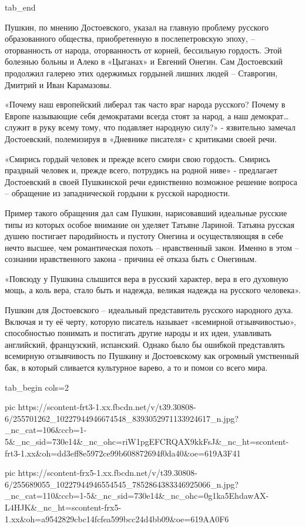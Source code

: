   tab_end
\fi

Пушкин, по мнению Достоевского, указал на главную проблему русского
образованного общества, приобретенную в послепетровскую эпоху,  – оторванность
от народа, оторванность от корней, бессильную гордость. Этой болезнью больны и
Алеко в «Цыганах» и Евгений Онегин. Сам Достоевский продолжил галерею этих
одержимых гордыней лишних людей – Ставрогин, Дмитрий и Иван Карамазовы. 

«Почему наш европейский либерал так часто враг народа русского? Почему в Европе
называющие себя демократами всегда стоят за народ, а наш демократ… служит в
руку всему тому, что подавляет народную силу?» - язвительно замечал
Достоевский, полемизируя в «Дневнике писателя» с критиками своей речи.

«Смирись гордый человек и прежде всего смири свою гордость. Смирись праздный
человек и, прежде всего, потрудись на родной ниве» - предлагает Достоевский в
своей Пушкинской речи  единственно возможное решение вопроса – обращение из
западнической гордыни к русской народности.

Пример такого обращения дал сам Пушкин, нарисовавший идеальные русские типы из
которых особое внимание он уделяет  Татьяне Лариной. Татьяна русская душею
постигает пародийность и пустоту Онегина и осуществляющяя в себе нечто высшее,
чем романтическая похоть – нравственный закон. Именно в этом – сознании
нравственного закона - причина её отказа быть с Онегиным.

«Повсюду у Пушкина слышится вера в русский характер, вера в его духовную мощь,
а коль вера, стало быть и надежда, великая надежда на русского человека».

Пушкин для Достоевского – идеальный представитель русского народного духа.
Включая и ту её черту, которую писатель называет «всемирной отзывчивостью»,
способностью понимать и постигать другие народы и их идеи, улавливать
английский, французский, испанский. Однако было бы ошибкой представлять
всемирную отзывчивость по Пушкину и Достоевскому как огромный умственный бак, в
который сливается культурное варево, а то и помои со всего мира.

\ifcmt
  tab_begin cols=2

     pic https://scontent-frt3-1.xx.fbcdn.net/v/t39.30808-6/255701262_10227944946674548_8393052971133924617_n.jpg?_nc_cat=106&ccb=1-5&_nc_sid=730e14&_nc_ohc=riW1pgEFCRQAX9kkFsJ&_nc_ht=scontent-frt3-1.xx&oh=dd3eff8e5972ce99b608872694f0da40&oe=619A3F41

     pic https://scontent-frx5-1.xx.fbcdn.net/v/t39.30808-6/255689055_10227944946554545_7852864383346925066_n.jpg?_nc_cat=110&ccb=1-5&_nc_sid=730e14&_nc_ohc=0g1ka5EhdawAX-L4HJK&_nc_ht=scontent-frx5-1.xx&oh=a9542829cbc14fcfea599bcc24d4bb09&oe=619AA0F6

